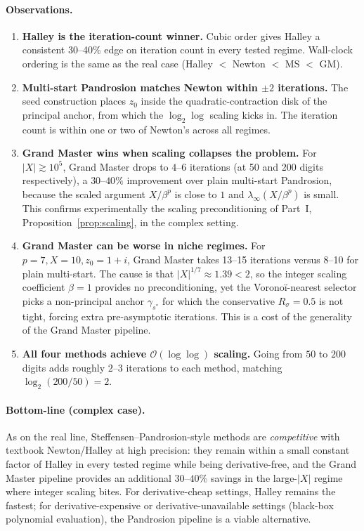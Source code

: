 \documentclass[11pt,a4paper]{article}
\theoremstyle{definition}
\begin{document}
\paragraph{Observations.}
\begin{enumerate}
  \item \textbf{Halley is the iteration-count winner.} Cubic order gives Halley a consistent 30--40\% edge on iteration count in every tested regime. Wall-clock ordering is the same as the real case (Halley $<$ Newton $<$ MS $<$ GM).
  \item \textbf{Multi-start Pandrosion matches Newton within $\pm 2$ iterations.} The seed construction places $z_0$ inside the quadratic-contraction disk of the principal anchor, from which the $\log_2 \log$ scaling kicks in. The iteration count is within one or two of Newton's across all regimes.
  \item \textbf{Grand Master wins when scaling collapses the problem.} For $|X| \gtrsim 10^5$, Grand Master drops to $4$--$6$ iterations (at 50 and 200 digits respectively), a $30$--$40\%$ improvement over plain multi-start Pandrosion, because the scaled argument $X/\beta^p$ is close to $1$ and $\lambda_\infty(X/\beta^p)$ is small. This confirms experimentally the scaling preconditioning of Part~I, Proposition~\ref{prop:scaling}, in the complex setting.
  \item \textbf{Grand Master can be worse in niche regimes.} For $p = 7, X = 10, z_0 = 1+i$, Grand Master takes 13--15 iterations versus 8--10 for plain multi-start. The cause is that $|X|^{1/7} \approx 1.39 < 2$, so the integer scaling coefficient $\beta = 1$ provides no preconditioning, yet the Voronoï-nearest selector picks a non-principal anchor $\gamma_{s^\ast}$ for which the conservative $R_\sigma = 0.5$ is not tight, forcing extra pre-asymptotic iterations. This is a cost of the generality of the Grand Master pipeline.
  \item \textbf{All four methods achieve $\mathcal{O}(\log\log)$ scaling.} Going from $50$ to $200$ digits adds roughly $2$--$3$ iterations to each method, matching $\log_2(200/50) = 2$.
\end{enumerate}

\paragraph{Bottom-line (complex case).} As on the real line, Steffensen--Pandrosion-style methods are \emph{competitive} with textbook Newton/Halley at high precision: they remain within a small constant factor of Halley in every tested regime while being derivative-free, and the Grand Master pipeline provides an additional $30$--$40\%$ savings in the large-$|X|$ regime where integer scaling bites. For derivative-cheap settings, Halley remains the fastest; for derivative-expensive or derivative-unavailable settings (black-box polynomial evaluation), the Pandrosion pipeline is a viable alternative.
\end{document}
